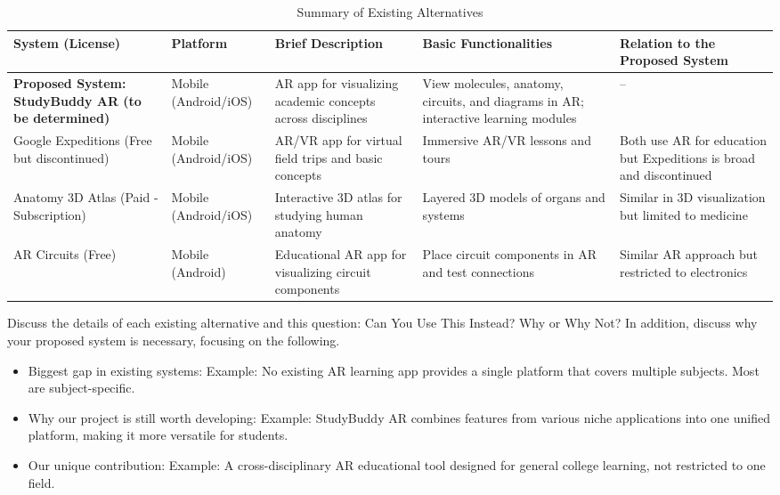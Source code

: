     \begin{table}[ht]
    \vspace{4ex}
    \centering
        \caption{Summary of Existing Alternatives}   
        \label{table:existing-alternatives-summary}
        \smalltable
        \begin{tabular}{|>{\raggedright\arraybackslash}p{2.8cm}|>{\raggedright\arraybackslash}p{1.8cm}|>{\raggedright\arraybackslash}p{2.8cm}|>{\raggedright\arraybackslash}p{2.8cm}|>{\raggedright\arraybackslash}p{2.8cm}|}
            \hline
            	\textbf{System (License)} & \textbf{Platform} & \textbf{Brief Description} & \textbf{Basic Functionalities} & \textbf{Relation to the Proposed System} \\
            \hline\hline
            	\textbf{Proposed System: StudyBuddy AR (to be determined)} & Mobile (Android/iOS) & AR app for visualizing academic concepts across disciplines & View molecules, anatomy, circuits, and diagrams in AR; interactive learning modules & -- \\
            \hline
            Google Expeditions (Free but discontinued) & Mobile (Android/iOS) & AR/VR app for virtual field trips and basic concepts & Immersive AR/VR lessons and tours & Both use AR for education but Expeditions is broad and discontinued \\
            \hline
            Anatomy 3D Atlas (Paid - Subscription) & Mobile (Android/iOS) & Interactive 3D atlas for studying human anatomy & Layered 3D models of organs and systems & Similar in 3D visualization but limited to medicine \\
            \hline
            AR Circuits (Free) & Mobile (Android) & Educational AR app for visualizing circuit components & Place circuit components in AR and test connections & Similar AR approach but restricted to electronics \\
            \hline
        \end{tabular}
    \vspace{4ex}
    \end{table}

    Discuss the details of each existing alternative and this question: Can You Use This Instead? Why or Why Not? In addition, discuss why your proposed system is necessary, focusing on the following.
    \begin{itemize}
    \item Biggest gap in existing systems: Example: No existing AR learning app provides a single platform that covers multiple subjects. Most are subject-specific.
    \item Why our project is still worth developing: Example: StudyBuddy AR combines features from various niche applications into one unified platform, making it more versatile for students.
    \item Our unique contribution: Example: A cross-disciplinary AR educational tool designed for general college learning, not restricted to one field.
\end{itemize}
